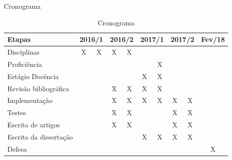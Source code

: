 \documentclass[handout]{beamer}
\begin{document}



\begin{frame}{Cronograma}
\begin{table}[h]\footnotesize
\centering
\caption{Cronograma}
\label{tb:cronograma}
\begin{tabular}{|l|c|c|c|c|c|c|c|c|c|}
\hline
\textbf{Etapas} & \multicolumn{2}{l|}{\textbf{2016/1}} & \multicolumn{2}{l|}{\textbf{2016/2}} & \multicolumn{2}{l|}{\textbf{2017/1}} & \multicolumn{2}{l|}{\textbf{2017/2}} & \multicolumn{1}{l|}{\textbf{Fev/18}} \\ \hline
Disciplinas & X & X & X & X &  &  &  &  &  \\ \hline
Proficiência &  &  &  &  &  & X &  &  &  \\ \hline
Estágio Docência &  &  &  &  & X & X &  &  &  \\ \hline
Revisão bibliográfica &  &  & X & X & X & X &  &  &  \\ \hline
Implementação &  &  & X & X & X & X & X & X &  \\ \hline
Testes &  &  & X & X &  &  & X & X &  \\ \hline
Escrita de artigos &  &  & X & X &  &  & X & X  &  \\ \hline
Escrita da dissertação &  &  &  &  & X & X & X & X &  \\ \hline
Defesa &  &  &  &  &  &  &  &  & X \\ \hline
\end{tabular}
\end{table}
\end{frame}
\end{document}
